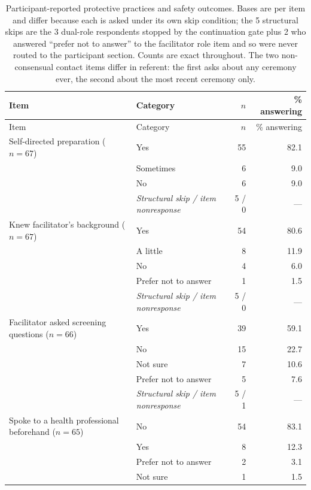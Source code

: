 \documentclass[12pt]{article}
\begin{document}
\clearpage
{}
\begin{longtable}{p{5.2cm}p{4.8cm}rr}
\caption{Participant-reported protective practices and safety outcomes. Bases are per item and differ
because each is asked under its own skip condition; the 5 structural skips are the 3 dual-role respondents
stopped by the continuation gate plus 2 who answered ``prefer not to answer'' to the facilitator role item
and so were never routed to the participant section. Counts are exact throughout. The two non-consensual
contact items differ in referent: the first asks about any ceremony ever, the second about the most recent
ceremony only.}
\label{tab:safety} \\
\toprule
Item & Category & $n$ & \% answering \\
\midrule
\endfirsthead
\toprule
Item & Category & $n$ & \% answering \\
\midrule
\endhead
Self-directed preparation ($n=67$) & Yes & 55 & 82.1 \\
                & Sometimes & 6 & 9.0 \\
                & No & 6 & 9.0 \\
                & \emph{Structural skip / item nonresponse} & 5 / 0 & --- \\
\addlinespace
Knew facilitator's background ($n=67$) & Yes & 54 & 80.6 \\
                & A little & 8 & 11.9 \\
                & No & 4 & 6.0 \\
                & Prefer not to answer & 1 & 1.5 \\
                & \emph{Structural skip / item nonresponse} & 5 / 0 & --- \\
\addlinespace
Facilitator asked screening questions ($n=66$) & Yes & 39 & 59.1 \\
                & No & 15 & 22.7 \\
                & Not sure & 7 & 10.6 \\
                & Prefer not to answer & 5 & 7.6 \\
                & \emph{Structural skip / item nonresponse} & 5 / 1 & --- \\
\addlinespace
Spoke to a health professional beforehand ($n=65$) & No & 54 & 83.1 \\
                & Yes & 8 & 12.3 \\
                & Prefer not to answer & 2 & 3.1 \\
                & Not sure & 1 & 1.5 \\

\end{longtable}
\end{document}
